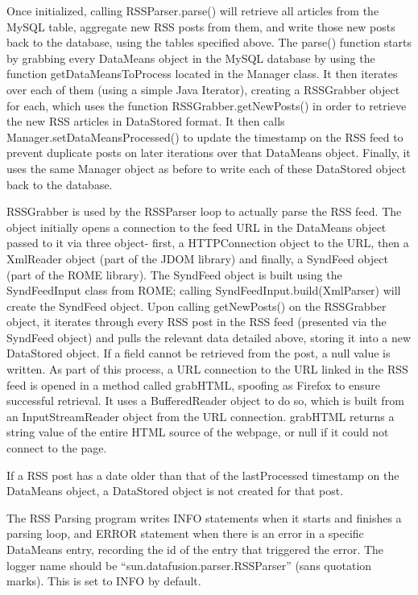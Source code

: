 \documentclass[10pt]{article} %
\begin{document}
Once initialized, calling RSSParser.parse() will retrieve all articles from the MySQL table, aggregate new RSS posts from them, and write those new posts back to the database, using the tables specified above. The parse() function starts by grabbing every DataMeans object in the MySQL database by using the function getDataMeansToProcess located in the Manager class. It then iterates over each of them (using a simple Java Iterator), creating a RSSGrabber object for each, which uses the function RSSGrabber.getNewPosts() in order to retrieve the new RSS articles in DataStored format. It then calls Manager.setDataMeansProcessed() to update the timestamp on the RSS feed to prevent duplicate posts on later iterations over that DataMeans object. Finally, it uses the same Manager object as before to write each of these DataStored object back to the database.

RSSGrabber is used by the RSSParser loop to actually parse the RSS feed. The object initially opens a connection to the feed URL in the DataMeans object passed to it via three object- first, a HTTPConnection object to the URL, then a XmlReader object (part of the JDOM library) and finally, a SyndFeed object (part of the ROME library). The SyndFeed object is built using the SyndFeedInput class from ROME; calling SyndFeedInput.build(XmlParser) will create the SyndFeed object. Upon calling getNewPosts() on the RSSGrabber object, it iterates through every RSS post in the RSS feed (presented via the SyndFeed object) and pulls the relevant data detailed above, storing it into a new DataStored object. If a field cannot be retrieved from the post, a null value is written. As part of this process, a URL connection to the URL linked in the RSS feed is opened in a method called grabHTML, spoofing as Firefox to ensure successful retrieval. It uses a BufferedReader object to do so, which is built from an InputStreamReader object from the URL connection. grabHTML returns a string value of the entire HTML source of the webpage, or null if it could not connect to the page.

If a RSS post has a date older than that of the lastProcessed timestamp on the DataMeans object, a DataStored object is not created for that post.

The RSS Parsing program writes INFO statements when it starts and finishes a parsing loop, and ERROR statement when there is an error in a specific DataMeans entry, recording the id of the entry that triggered the error. The logger name should be “sun.datafusion.parser.RSSParser” (sans quotation marks). This is set to INFO by default.
\end{document}
